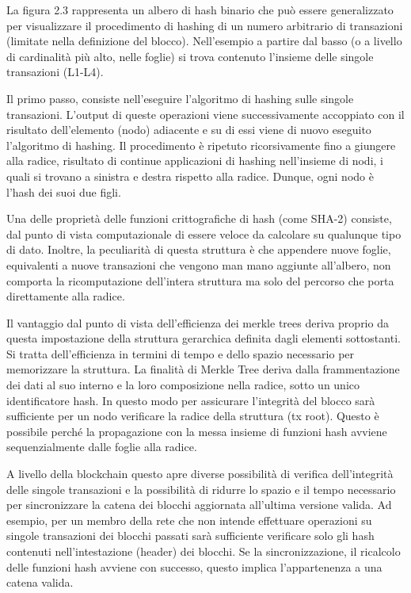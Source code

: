 La figura 2.3 rappresenta un albero di hash binario che può essere generalizzato per visualizzare il procedimento di hashing di un numero arbitrario di transazioni (limitate nella definizione del blocco). Nell'esempio a partire dal basso (o a livello di cardinalità più alto, nelle foglie) si trova contenuto l'insieme delle singole transazioni (L1-L4).

Il primo passo, consiste nell’eseguire l'algoritmo di hashing sulle singole transazioni. L'output di queste operazioni viene successivamente accoppiato con il risultato dell'elemento (nodo) adiacente e su di essi viene di nuovo eseguito l'algoritmo di hashing. Il procedimento è ripetuto ricorsivamente fino a giungere alla radice, risultato di continue applicazioni di hashing nell'insieme di nodi, i quali si trovano a sinistra e destra rispetto alla radice. Dunque, ogni nodo è l'hash dei suoi due figli. 

Una delle proprietà delle funzioni crittografiche di hash (come SHA-2) consiste, dal punto di vista computazionale di essere veloce da calcolare su qualunque tipo di dato. Inoltre, la peculiarità di questa struttura è che appendere nuove foglie, equivalenti a nuove transazioni che vengono man mano aggiunte all’albero, non comporta la ricomputazione dell’intera struttura ma solo del percorso che porta direttamente alla radice.

Il vantaggio dal punto di vista dell'efficienza dei merkle trees deriva proprio da questa impostazione della struttura gerarchica definita dagli elementi sottostanti. Si tratta dell'efficienza in termini di tempo e dello spazio necessario per memorizzare la struttura. La finalità di Merkle Tree deriva dalla frammentazione dei dati al suo interno e la loro composizione nella radice, sotto un unico identificatore hash. In questo modo per assicurare l'integrità del blocco sarà sufficiente per un nodo verificare la radice della struttura (tx root). Questo è possibile perché la propagazione con la messa insieme di funzioni hash avviene sequenzialmente dalle foglie alla radice.

A livello della blockchain questo apre diverse possibilità di verifica dell'integrità delle singole transazioni e la possibilità di ridurre lo spazio e il tempo necessario per sincronizzare la catena dei blocchi aggiornata all'ultima versione valida. Ad esempio, per un membro della rete che non intende effettuare operazioni su singole transazioni dei blocchi passati sarà sufficiente verificare solo gli hash contenuti nell'intestazione (header) dei blocchi. Se la sincronizzazione, il ricalcolo delle funzioni hash avviene con successo, questo implica l'appartenenza a una catena valida.

